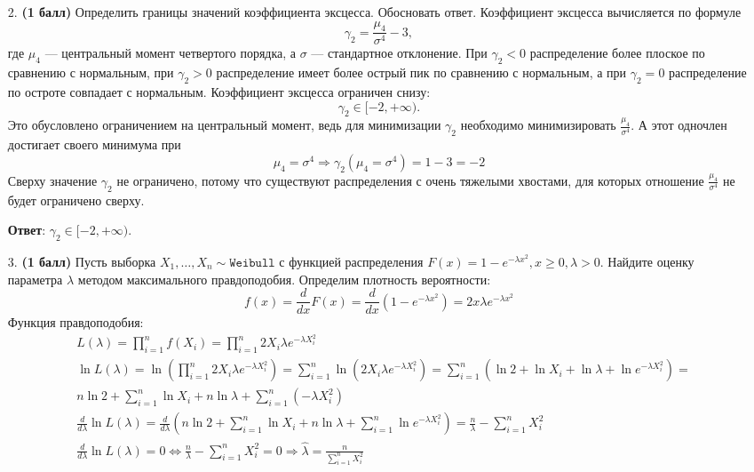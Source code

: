 \documentclass{assignment}
\begin{document}
\begin{enumerate}
    \item[2.] \textbf{(1 балл)} Определить границы значений коэффициента эксцесса. Обосновать ответ.
    \start
    Коэффициент эксцесса вычисляется по формуле
    \begin{equation}
        \gamma_2 = \frac{\mu_4}{\sigma^4} - 3,
    \end{equation}
    где $\mu_4$ — центральный момент четвертого порядка, а $\sigma$ — стандартное отклонение. При $\gamma_2 < 0$ распределение более плоское по сравнению с нормальным, при $\gamma_2 > 0$ распределение имеет более острый пик по сравнению с нормальным, а при $\gamma_2 = 0$ распределение по остроте совпадает с нормальным. Коэффициент эксцесса ограничен снизу:
    \begin{equation}
        \gamma_2 \in [-2, +\infty).
    \end{equation}
    Это обусловлено ограничением на центральный момент, ведь для минимизации $\gamma_2$ необходимо минимизировать $\frac{\mu_4}{\sigma^4}$. А этот одночлен достигает своего минимума при 
    \begin{equation}
        \mu_4 = \sigma^4 \Rightarrow \gamma_2(\mu_4 = \sigma^4) = 1 - 3 = - 2
    \end{equation}
    Сверху значение $\gamma_2$ не ограничено, потому что существуют распределения с очень тяжелыми хвостами, для которых отношение $\frac{\mu_4}{\sigma^4}$ не будет ограничено сверху.
    
    \textbf{Ответ}: $\gamma_2 \in [-2, +\infty)$.
    \finish

    \item[3.] \textbf{(1 балл)} Пусть выборка $X_1, \ldots, X_n \sim \texttt{Weibull}$ с функцией распределения $F(x) = 1 - e^{-\lambda x^2}, x \geq 0, \lambda > 0$. Найдите оценку параметра $\lambda$ методом максимального правдоподобия.
    \start
    Определим плотность вероятности:
    \begin{equation}
        f(x) = \frac{d}{dx}F(x) = \frac{d}{dx}(1 - e^{-\lambda x^2}) = 2 x \lambda e^{-\lambda x^2}
    \end{equation}
    Функция правдоподобия:
    \begin{align*}
        &L(\lambda) = \prod_{i=1}^{n}f(X_i) = \prod_{i=1}^{n}2 X_i \lambda e^{-\lambda X_i^2} \\
        &\ln L(\lambda) = \ln (\prod_{i=1}^{n}2 X_i \lambda e^{-\lambda X_i^2}) = \sum_{i=1}^{n} \ln (2 X_i \lambda e^{-\lambda X_i^2}) = \sum_{i=1}^{n} (\ln 2 + \ln X_i  + \ln \lambda + \ln e^{-\lambda X_i^2}) = \\
        &n\ln 2 + \sum_{i=1}^{n}\ln X_i  + n\ln \lambda + \sum_{i=1}^{n}(-\lambda X_i^2) \\
        &\frac{d}{d\lambda}\ln L(\lambda) = \frac{d}{d\lambda} (n\ln 2 + \sum_{i=1}^{n}\ln X_i  + n\ln \lambda + \sum_{i=1}^{n}\ln e^{-\lambda X_i^2}) = \frac{n}{\lambda} - \sum_{i=1}^{n} X_i^2 \\
        &\frac{d}{d\lambda}\ln L(\lambda) = 0 \Leftrightarrow \frac{n}{\lambda} - \sum_{i=1}^{n} X_i^2 = 0 \Rightarrow \hat{\lambda} = \frac{n}{\sum_{i=1}^{n} X_i^2}
    \end{align*}
    

\end{enumerate}
\end{document}
